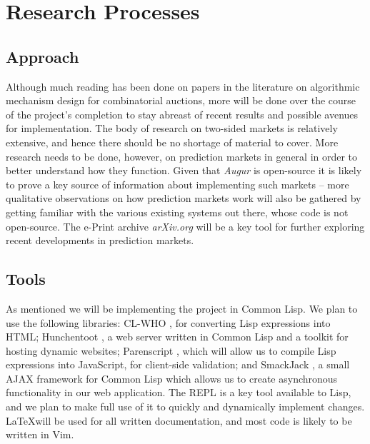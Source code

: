 \documentclass[10pt,a4paper]{article}
\theoremstyle{plain}
\theoremstyle{definition}
\begin{document}
\section{Research Processes}
	\label{sec:researchProcesses}

	\subsection{Approach}

	Although much reading has been done on papers in the literature on
	algorithmic mechanism design for combinatorial auctions, more will be done
	over the course of the project's completion to stay abreast of recent
	results and possible avenues for implementation. The body of research on
	two-sided markets is relatively extensive, and hence there should be no
	shortage of material to cover. More research needs to be done, however, on
	prediction markets in general in order to better understand how they
	function. Given that \emph{Augur} is open-source it is likely to prove a
	key source of information about implementing such markets -- more
	qualitative observations on how prediction markets work will also be
	gathered by getting familiar with the various existing systems out there,
	whose code is not open-source. The e-Print archive \emph{arXiv.org} will be
	a key tool for further exploring recent developments in prediction markets.

	\subsection{Tools} 

	As mentioned we will be implementing the project in Common Lisp. We plan to
	use the following libraries: CL-WHO \cite{CL-WHO}, for converting Lisp
	expressions into HTML; Hunchentoot \cite{Hunchentoot}, a web server written
	in Common Lisp and a toolkit for hosting dynamic websites; Parenscript
	\cite{Parenscript}, which will allow us to compile Lisp expressions into
	JavaScript, for client-side validation; and SmackJack \cite{SmackJack}, a
	small AJAX framework for Common Lisp which allows us to create asynchronous
	functionality in our web application. The REPL is a key tool available to
	Lisp, and we plan to make full use of it to quickly and dynamically
	implement changes. \LaTeX will be used for all written documentation, and
	most code is likely to be written in Vim.
\end{document}
